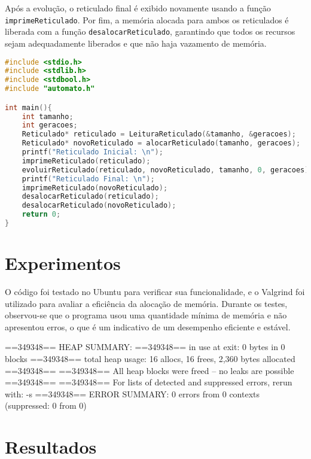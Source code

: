 \documentclass{article}
\begin{document}
Após a evolução, o reticulado final é exibido novamente usando a função \verb|imprimeReticulado|. Por fim, a memória alocada para ambos os reticulados é liberada com a função \verb|desalocarReticulado|, garantindo que todos os recursos sejam adequadamente liberados e que não haja vazamento de memória.
\begin{lstlisting}[caption={},label={lst:cod1},language=C]
#include <stdio.h>
#include <stdlib.h>
#include <stdbool.h>
#include "automato.h"

int main(){
    int tamanho;
    int geracoes;
    Reticulado* reticulado = LeituraReticulado(&tamanho, &geracoes);
    Reticulado* novoReticulado = alocarReticulado(tamanho, geracoes);
    printf("Reticulado Inicial: \n");
    imprimeReticulado(reticulado);
    evoluirReticulado(reticulado, novoReticulado, tamanho, 0, geracoes);
    printf("Reticulado Final: \n");
    imprimeReticulado(novoReticulado);
    desalocarReticulado(reticulado);
    desalocarReticulado(novoReticulado);
    return 0;
}
\end{lstlisting}

 
\clearpage
\section{Experimentos}

O código foi testado no Ubuntu para verificar sua funcionalidade, e o Valgrind foi utilizado para avaliar a eficiência da alocação de memória. Durante os testes, observou-se que o programa usou uma quantidade mínima de memória e não apresentou erros, o que é um indicativo de um desempenho eficiente e estável. 

==349348== HEAP SUMMARY:
==349348==     in use at exit: 0 bytes in 0 blocks
==349348==   total heap usage: 16 allocs, 16 frees, 2,360 bytes allocated
==349348==
==349348== All heap blocks were freed -- no leaks are possible
==349348==
==349348== For lists of detected and suppressed errors, rerun with: -s
==349348== ERROR SUMMARY: 0 errors from 0 contexts (suppressed: 0 from 0)

\clearpage
\section{Resultados}

\end{document}
